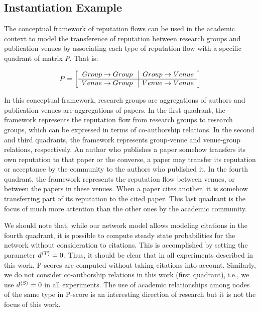 \documentclass[notitlepage]{svjour3}
\begin{document}
\subsection{Instantiation Example}\label{sec:example}

The conceptual framework of reputation flows can be used in the academic context
to model the transference of reputation between research groups and 
publication venues by associating each type of reputation flow with a specific quadrant
of matrix $P$. That is:

\begin{align}\label{eq:newp}
P =
\left[
\begin{array}{r | r}
Group \rightarrow {Group\ } & Group \rightarrow Venue \\
\hline
Venue \rightarrow {Group\ } & Venue \rightarrow Venue \\
\end{array}
\right]
\end{align}

In this conceptual framework, research groups are 
aggregations of authors and publication venues are aggregations of papers.
In the first quadrant, the framework represents the reputation
flow from research groups to research groups, which can be expressed in
terms of co-authorship relations. In the second and 
third quadrants, the framework
represents group-venue and venue-group relations,
respectively. An author who publishes a paper somehow
transfers its own reputation to that paper or the converse,
a paper may transfer its reputation or acceptance by the
community to the authors who published it. In the fourth
quadrant, the framework represents the reputation flow between
venues, or between the papers in these venues. When a paper cites 
another, it is somehow
transferring part of its reputation to the cited paper. This
last quadrant is the focus of much more attention than the
other ones by the academic community. 

We should note that, while our network model allows modeling citations in the fourth quadrant, it is possible to compute 
steady state probabilities for the network without consideration to citations. This is accomplished by setting the parameter 
$d{^{\langle T \rangle}} = 0$. Thus, it should be clear that in all experiments described in this work, P-scores 
are computed without taking citations into account. 
Similarly, we do not consider co-authorship relations in this work (first quadrant), i.e., we use $d{^{\langle S \rangle}} = 0$ in all experiments. The use of academic relationships among nodes of the same type in P-score is an interesting direction of research but it is not the focus of this work.%
\end{document}
